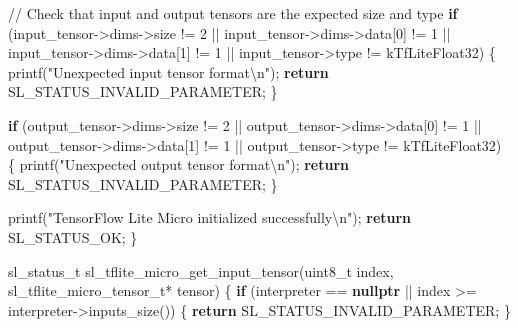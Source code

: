 \documentclass[
  9pt,
  letterpaper,
  abstract,
  titlepage]{scrbook}
\newenvironment{Shaded}{\begin{snugshade}}{\end{snugshade}}
\newcommand{\CommentTok}[1]{\textcolor[rgb]{0.37,0.37,0.37}{#1}}
\newcommand{\ControlFlowTok}[1]{\textcolor[rgb]{0.00,0.23,0.31}{\textbf{#1}}}
\newcommand{\DataTypeTok}[1]{\textcolor[rgb]{0.68,0.00,0.00}{#1}}
\newcommand{\DecValTok}[1]{\textcolor[rgb]{0.68,0.00,0.00}{#1}}
\newcommand{\KeywordTok}[1]{\textcolor[rgb]{0.00,0.23,0.31}{\textbf{#1}}}
\newcommand{\NormalTok}[1]{\textcolor[rgb]{0.00,0.23,0.31}{#1}}
\newcommand{\OperatorTok}[1]{\textcolor[rgb]{0.37,0.37,0.37}{#1}}
\newcommand{\SpecialCharTok}[1]{\textcolor[rgb]{0.37,0.37,0.37}{#1}}
\newcommand{\StringTok}[1]{\textcolor[rgb]{0.13,0.47,0.30}{#1}}
\begin{document}
\begin{Shaded}
\begin{Highlighting}[]
  \CommentTok{// Check that input and output tensors are the expected size and type}
  \ControlFlowTok{if} \OperatorTok{(}\NormalTok{input\_tensor}\OperatorTok{{-}\textgreater{}}\NormalTok{dims}\OperatorTok{{-}\textgreater{}}\NormalTok{size }\OperatorTok{!=} \DecValTok{2} \OperatorTok{||}\NormalTok{ input\_tensor}\OperatorTok{{-}\textgreater{}}\NormalTok{dims}\OperatorTok{{-}\textgreater{}}\NormalTok{data}\OperatorTok{[}\DecValTok{0}\OperatorTok{]} \OperatorTok{!=} \DecValTok{1} \OperatorTok{||} 
\NormalTok{      input\_tensor}\OperatorTok{{-}\textgreater{}}\NormalTok{dims}\OperatorTok{{-}\textgreater{}}\NormalTok{data}\OperatorTok{[}\DecValTok{1}\OperatorTok{]} \OperatorTok{!=} \DecValTok{1} \OperatorTok{||}\NormalTok{ input\_tensor}\OperatorTok{{-}\textgreater{}}\NormalTok{type }\OperatorTok{!=}\NormalTok{ kTfLiteFloat32}\OperatorTok{)} \OperatorTok{\{}
\NormalTok{    printf}\OperatorTok{(}\StringTok{"Unexpected input tensor format}\SpecialCharTok{\textbackslash{}n}\StringTok{"}\OperatorTok{);}
    \ControlFlowTok{return}\NormalTok{ SL\_STATUS\_INVALID\_PARAMETER}\OperatorTok{;}
  \OperatorTok{\}}
  
  \ControlFlowTok{if} \OperatorTok{(}\NormalTok{output\_tensor}\OperatorTok{{-}\textgreater{}}\NormalTok{dims}\OperatorTok{{-}\textgreater{}}\NormalTok{size }\OperatorTok{!=} \DecValTok{2} \OperatorTok{||}\NormalTok{ output\_tensor}\OperatorTok{{-}\textgreater{}}\NormalTok{dims}\OperatorTok{{-}\textgreater{}}\NormalTok{data}\OperatorTok{[}\DecValTok{0}\OperatorTok{]} \OperatorTok{!=} \DecValTok{1} \OperatorTok{||} 
\NormalTok{      output\_tensor}\OperatorTok{{-}\textgreater{}}\NormalTok{dims}\OperatorTok{{-}\textgreater{}}\NormalTok{data}\OperatorTok{[}\DecValTok{1}\OperatorTok{]} \OperatorTok{!=} \DecValTok{1} \OperatorTok{||}\NormalTok{ output\_tensor}\OperatorTok{{-}\textgreater{}}\NormalTok{type }\OperatorTok{!=}\NormalTok{ kTfLiteFloat32}\OperatorTok{)} \OperatorTok{\{}
\NormalTok{    printf}\OperatorTok{(}\StringTok{"Unexpected output tensor format}\SpecialCharTok{\textbackslash{}n}\StringTok{"}\OperatorTok{);}
    \ControlFlowTok{return}\NormalTok{ SL\_STATUS\_INVALID\_PARAMETER}\OperatorTok{;}
  \OperatorTok{\}}
  
\NormalTok{  printf}\OperatorTok{(}\StringTok{"TensorFlow Lite Micro initialized successfully}\SpecialCharTok{\textbackslash{}n}\StringTok{"}\OperatorTok{);}
  \ControlFlowTok{return}\NormalTok{ SL\_STATUS\_OK}\OperatorTok{;}
\OperatorTok{\}}

\NormalTok{sl\_status\_t sl\_tflite\_micro\_get\_input\_tensor}\OperatorTok{(}\DataTypeTok{uint8\_t}\NormalTok{ index}\OperatorTok{,}\NormalTok{ sl\_tflite\_micro\_tensor\_t}\OperatorTok{*}\NormalTok{ tensor}\OperatorTok{)}
\OperatorTok{\{}
  \ControlFlowTok{if} \OperatorTok{(}\NormalTok{interpreter }\OperatorTok{==} \KeywordTok{nullptr} \OperatorTok{||}\NormalTok{ index }\OperatorTok{\textgreater{}=}\NormalTok{ interpreter}\OperatorTok{{-}\textgreater{}}\NormalTok{inputs\_size}\OperatorTok{())} \OperatorTok{\{}
    \ControlFlowTok{return}\NormalTok{ SL\_STATUS\_INVALID\_PARAMETER}\OperatorTok{;}
  \OperatorTok{\}}
  

\end{Highlighting}
\end{Shaded}
\end{document}
